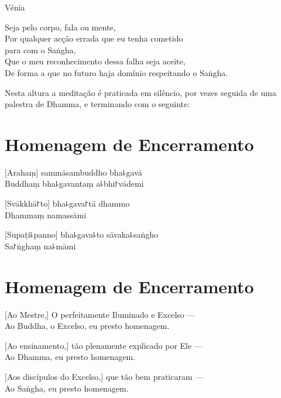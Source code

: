\enlargethispage{\baselineskip}

\vfill

\begin{instruction}
  Vénia
\end{instruction}

Seja pelo corpo, fala ou mente,\\
Por qualquer acção errada que eu tenha cometido\\
\vin para com o Saṅgha,\\
Que o meu reconhecimento dessa falha seja aceite,\\
De forma a que no futuro haja domínio respeitando o Saṅgha.

\begin{instruction}
  Nesta altura a meditação é praticada em silêncio, por vezes seguida de uma palestra de Dhamma, e terminando com o seguinte:
\end{instruction}

\clearpage

\chapter*{Homenagem de Encerramento}

\delegateSetUseNext

[Arahaṃ] sammāsambuddho bha꜕gavā\\
Buddhaṃ bha꜕gavantaṃ a꜕bhi꜓vādemi 

[Svākkhā꜓to] bha꜕gava꜓tā dhammo\\
Dhammaṃ namassāmi 

[Supaṭi꜕panno] bha꜕gava꜕to sāvaka꜕saṅgho\\
Sa꜓ṅghaṃ na꜕māmi 

\clearpage

\chapter{Homenagem de Encerramento}

[Ao Mestre,] O perfeitamente Iluminado e Excelso ---\\
Ao Buddha, o Excelso, eu presto homenagem. 

[Ao ensinamento,] tão plenamente explicado por Ele ---\\
Ao Dhamma, eu presto homenagem. 

[Aos discípulos do Excelso,] que tão bem praticaram ---\\
Ao Saṅgha, eu presto homenagem. 

